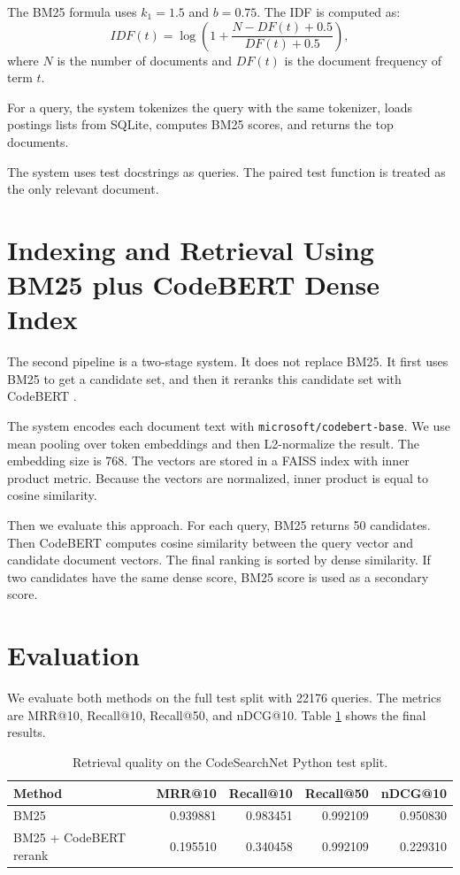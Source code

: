 \documentclass[11pt]{article}
\begin{document}
The BM25 formula uses $k_1 = 1.5$ and $b = 0.75$. The IDF is computed as:
\[
IDF(t) = \log \left(1 + \frac{N - DF(t) + 0.5}{DF(t) + 0.5}\right),
\]
where $N$ is the number of documents and $DF(t)$ is the document frequency of
term $t$.

For a query, the system tokenizes the query with the same tokenizer, loads
postings lists from SQLite, computes BM25 scores, and returns the top documents.

The system uses test docstrings as queries. The paired test function is treated
as the only relevant document. 

\section{Indexing and Retrieval Using BM25 plus CodeBERT Dense Index}

The second pipeline is a two-stage system. It does not replace BM25. It first
uses BM25 to get a candidate set, and then it reranks this candidate set with
CodeBERT \cite{codebert}.

The system encodes each document text with \texttt{microsoft/codebert-base}. We
use mean pooling over token embeddings and then L2-normalize the result. The
embedding size is 768. The vectors are stored in a FAISS index with inner product
metric. Because the vectors are normalized, inner product is equal to cosine
similarity.

Then we evaluate this approach. For each query, BM25 returns 50 candidates.
Then CodeBERT computes cosine similarity between the query vector and candidate document vectors. The final
ranking is sorted by dense similarity. If two candidates have the same dense
score, BM25 score is used as a secondary score.

\section{Evaluation}

We evaluate both methods on the full test split with 22176 queries. The metrics
are MRR@10, Recall@10, Recall@50, and nDCG@10. Table \ref{tab:metrics} shows the
final results.

\begin{table}[h]
\centering
\begin{tabular}{lrrrr}
\toprule
Method & MRR@10 & Recall@10 & Recall@50 & nDCG@10 \\
\midrule
BM25 & 0.939881 & 0.983451 & 0.992109 & 0.950830 \\
BM25 + CodeBERT rerank & 0.195510 & 0.340458 & 0.992109 & 0.229310 \\
\bottomrule
\end{tabular}
\caption{Retrieval quality on the CodeSearchNet Python test split.}
\label{tab:metrics}
\end{table}
\end{document}
